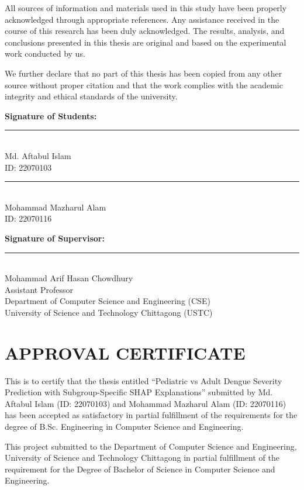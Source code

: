 \documentclass[12pt, a4paper]{report}
\begin{document}
All sources of information and materials used in this study have been properly acknowledged through appropriate references. Any assistance received in the course of this research has been duly acknowledged. The results, analysis, and conclusions presented in this thesis are original and based on the experimental work conducted by us.

We further declare that no part of this thesis has been copied from any other source without proper citation and that the work complies with the academic integrity and ethical standards of the university.

\vspace{1cm}
\noindent
\textbf{Signature of Students:} \\[1cm]
\noindent
\begin{minipage}{0.45\textwidth}
\rule{6cm}{0.4pt} \\
Md. Aftabul Islam \\
ID: 22070103
\end{minipage}
\hfill
\begin{minipage}{0.45\textwidth}
\rule{6cm}{0.4pt} \\
Mohammad Mazharul Alam \\
ID: 22070116
\end{minipage}

\vspace{1.5cm}
\noindent
\textbf{Signature of Supervisor:} \\[1cm]
\rule{6cm}{0.4pt} \\
Mohammad Arif Hasan Chowdhury \\
Assistant Professor \\
Department of Computer Science and Engineering (CSE)\\
University of Science and Technology Chittagong (USTC)

\chapter*{APPROVAL CERTIFICATE}
This is to certify that the thesis entitled ``Pediatric vs Adult Dengue Severity Prediction with Subgroup-Specific SHAP Explanations'' submitted by Md. Aftabul Islam (ID: 22070103) and Mohammad Mazharul Alam (ID: 22070116) has been accepted as satisfactory in partial fulfillment of the requirements for the degree of B.Sc. Engineering in Computer Science and Engineering.

This project submitted to the Department of Computer Science and Engineering, University of Science and Technology Chittagong in partial fulfillment of the requirement for the Degree of Bachelor of Science in Computer Science and Engineering.
\end{document}
